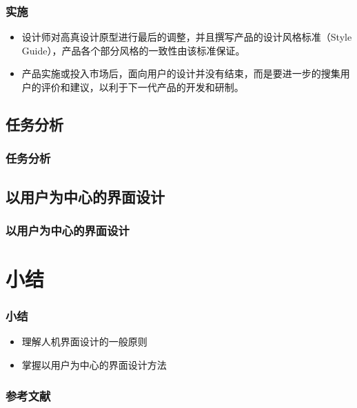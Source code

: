 \documentclass{beamer}
\begin{document}
\begin{frame}
	\frametitle{实施}
	\begin{itemize}
		\item 设计师对高真设计原型进行最后的调整，并且撰写产品的设计风格标准（Style Guide），产品各个部分风格的一致性由该标准保证。
		\item 产品实施或投入市场后，面向用户的设计并没有结束，而是要进一步的搜集用户的评价和建议，以利于下一代产品的开发和研制。
	\end{itemize}
\end{frame}

\subsection{任务分析}
\begin{frame}
	\frametitle{任务分析}

\end{frame}

\subsection{以用户为中心的界面设计}
\begin{frame}
	\frametitle{以用户为中心的界面设计}

\end{frame}

\section{小结}
\begin{frame}
	\frametitle{小结}
	\begin{itemize}
		\item 理解人机界面设计的一般原则
		\item 掌握以用户为中心的界面设计方法
	\end{itemize}
\end{frame}

\begin{frame}
	\frametitle{参考文献}
	
	
\end{frame}
\end{document}
